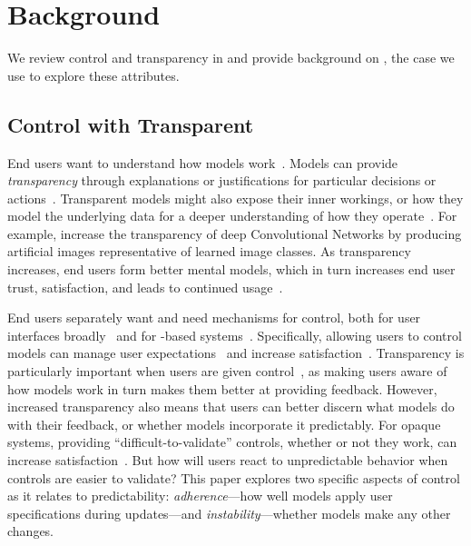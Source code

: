 \section{Background}
We review control and transparency in  and provide background on \hltm{}, the case we use to explore these attributes.

\subsection{Control with Transparent }

End users want to understand how  models work~\cite{Lim2009AssessingApplications}. Models can provide \textit{transparency} through explanations or justifications for particular decisions or actions~\cite{Biran2017Human-centricPredictions, Bilgic2005ExplainingPromotion}. Transparent models might also expose their inner workings, or how they model the underlying data for a deeper understanding of how they operate~\cite{Chaney2012VisualizingModels}. For example,  increase the transparency of deep Convolutional Networks by producing artificial images representative of learned image classes. As transparency increases, end users form better mental models, which 
in turn increases end user trust, satisfaction, and leads to continued usage~\cite{Lim2009WhySystems, Herlocker2000ExplainingRecommendations, Pu2006TrustInterfaces, Kulesza2013TooModels}.

End users separately want and need mechanisms for control, both for user interfaces broadly~\cite{Shneiderman2009DesigningInteraction} and for -based systems~\cite{Amershi2019GuidelinesInteraction}. Specifically, allowing users to control models can
manage user expectations~\cite{Kocielnik2019WillSystems} and
increase satisfaction~\cite{Roy2019AutomationBetter, Vaccaro2018TheSettings}. 
Transparency is particularly important when users are given control~\cite{Kulesza2010ExplanatoryPrograms, Rosenthal2010TowardsData}, as making users aware of how models work in turn makes them better at providing feedback. 
However, increased transparency also means that users can better discern what models do with their feedback, or whether models incorporate it predictably.
For opaque systems, providing ``difficult-to-validate'' controls, whether or not they work, can increase satisfaction~\cite{Vaccaro2018TheSettings}. 
But how will users react to unpredictable behavior when controls are easier to validate?
This paper explores two specific aspects of control as it relates to predictability: \textit{adherence}---how well models apply user specifications during
updates---and \textit{instability}---whether models make any other changes.

